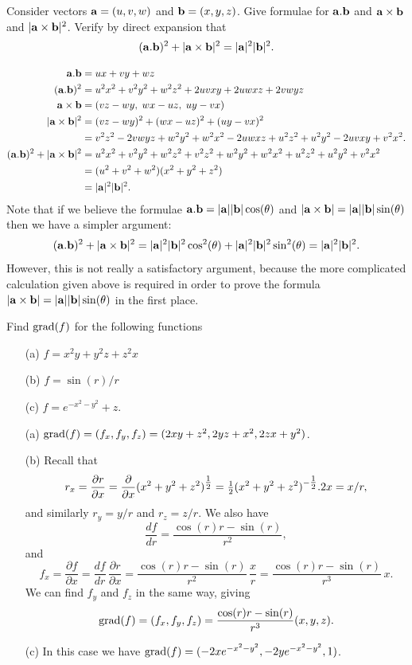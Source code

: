 \documentclass[a4paper]{amsart}
\renewenvironment{solution}{\SolutionInline}{\endSolutionInline}
\begin{document}
\begin{exercise}
 Consider vectors $\mathbf{a}=(u,v,w)$ and $\mathbf{b}=(x,y,z)$.  Give formulae for 
 $\mathbf{a}.\mathbf{b}$ and $\mathbf{a}\times\mathbf{b}$ and $|\mathbf{a}\times\mathbf{b}|^2$.  Verify by direct
 expansion that 
 \[ (\mathbf{a}.\mathbf{b})^2+|\mathbf{a}\times\mathbf{b}|^2=|\mathbf{a}|^2|\mathbf{b}|^2. \]
\end{exercise}
\begin{solution}
 \begin{align*}
  \mathbf{a}.\mathbf{b} &= ux+vy+wz \\
  (\mathbf{a}.\mathbf{b})^2 &= u^2x^2+v^2y^2+w^2z^2+2uvxy+2uwxz+2vwyz \\
  \mathbf{a}\times\mathbf{b} &= (vz-wy,\;wx-uz,\;uy-vx) \\
  |\mathbf{a}\times\mathbf{b}|^2 &= (vz-wy)^2+(wx-uz)^2+(uy-vx)^2 \\
   &= v^2z^2-2vwyz+w^2y^2 +
      w^2x^2-2uwxz+u^2z^2 +
      u^2y^2-2uvxy+v^2x^2. \\
  (\mathbf{a}.\mathbf{b})^2+|\mathbf{a}\times\mathbf{b}|^2 
   &= u^2x^2+v^2y^2+w^2z^2+
      v^2z^2+w^2y^2 +
      w^2x^2+u^2z^2 +
      u^2y^2+v^2x^2 \\
   &= (u^2+v^2+w^2)(x^2+y^2+z^2) \\
   &= |\mathbf{a}|^2|\mathbf{b}|^2.
 \end{align*}
 Note that if we believe the formulae $\mathbf{a}.\mathbf{b}=|\mathbf{a}||\mathbf{b}|\cos(\theta)$
 and $|\mathbf{a}\times\mathbf{b}|=|\mathbf{a}||\mathbf{b}|\sin(\theta)$ then we have a simpler
 argument:
 \[ (\mathbf{a}.\mathbf{b})^2+|\mathbf{a}\times\mathbf{b}|^2 = 
     |\mathbf{a}|^2|\mathbf{b}|^2\cos^2(\theta) + |\mathbf{a}|^2|\mathbf{b}|^2\sin^2(\theta) =
      |\mathbf{a}|^2|\mathbf{b}|^2. 
 \]
 However, this is not really a satisfactory argument, because the more
 complicated calculation given above is required in order to prove the
 formula $|\mathbf{a}\times\mathbf{b}|=|\mathbf{a}||\mathbf{b}|\sin(\theta)$ in the first place.
\end{solution}

\begin{exercise}
 Find $\operatorname{grad}(f)$ for the following functions 
 \begin{itemize}
  \item[(a)] $f=x^2y+y^2z+z^2x$
  \item[(b)] $f=\sin(r)/r$
  \item[(c)] $f=e^{-x^2-y^2}+z$.
 \end{itemize}
\end{exercise}
\begin{solution}
 \begin{itemize}
  \item[(a)] $\operatorname{grad}(f)=(f_x,f_y,f_z)=(2xy+z^2,2yz+x^2,2zx+y^2)$.
  \item[(b)] Recall that 
   \[ r_x = \frac{\partial r}{\partial x} = \frac{\partial}{\partial x}(x^2+y^2+z^2)^{\tfrac{1}{2}} =
       \tfrac{1}{2}(x^2+y^2+z^2)^{-\tfrac{1}{2}}.2x = x/r,
   \]
   and similarly $r_y=y/r$ and $r_z=z/r$.  We also have
   \[ \frac{df}{dr} = \frac{\cos(r)r-\sin(r)}{r^2}, \]
   and 
   \[ f_x = \frac{\partial f}{\partial x} =
       \frac{df}{dr}\,\frac{\partial r}{\partial x} = 
       \frac{\cos(r)r-\sin(r)}{r^2}\,\frac{x}{r} = 
        \frac{\cos(r)r-\sin(r)}{r^3}\,x.
   \]
   We can find $f_y$ and $f_z$ in the same way, giving
   \[ \operatorname{grad}(f) = (f_x,f_y,f_z) =
       \frac{\cos(r)r-\sin(r)}{r^3} (x,y,z).
   \]
  \item[(c)] In this case we have
   $\operatorname{grad}(f)=(-2xe^{-x^2-y^2},-2ye^{-x^2-y^2},1)$.
 \end{itemize}
\end{solution}
\end{document}
